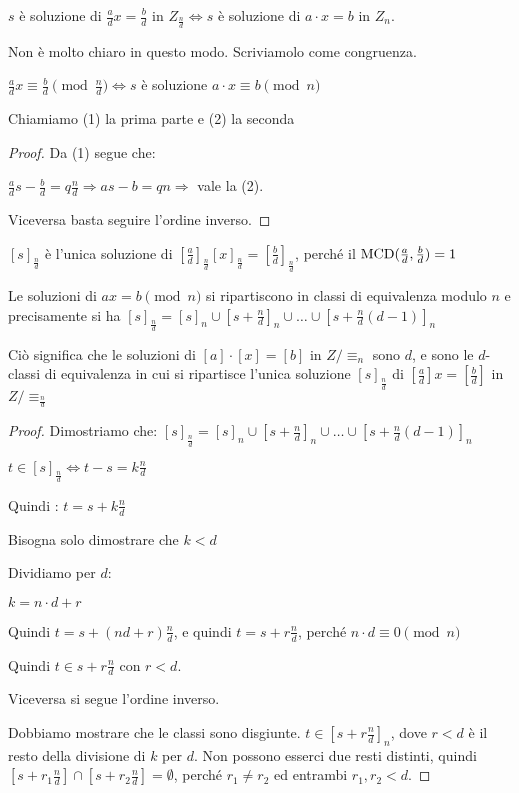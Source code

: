\begin{enumerate}
    $s$ \`e soluzione di $\frac{a}{d} x = \frac{b}{d}$ in $Z_{\frac{n}{d}} \Leftrightarrow s$ \`e soluzione di $a \cdot x = b$ in $Z_n$.

    Non \`e molto chiaro in questo modo. Scriviamolo come congruenza.

    $\frac{a}{d} x \equiv \frac{b}{d} \pmod \frac{n}{d} \Leftrightarrow s$ \`e soluzione $a \cdot x \equiv b \pmod n$

    Chiamiamo (1) la prima parte e (2) la seconda
    \begin{proof}
    Da (1) segue che:

    $\frac{a}{d} s - \frac{b}{d} = q \frac{n}{d} \Rightarrow a s - b = q n \Rightarrow$ vale la (2).

    Viceversa basta seguire l'ordine inverso.
    \end{proof}
    $[s]_{\frac{n}{d}}$ \`e l'unica soluzione di $[\frac{a}{d}]_{\frac{n}{d}} [x]_{\frac{n}{d}} = [\frac{b}{d}]_{\frac{n}{d}}$, perch\'e il $\operatorname{MCD}(\frac{a}{d}, \frac{b}{d}) = 1$

    Le soluzioni di $ax = b \pmod n$ si ripartiscono in classi di equivalenza modulo $n$ e precisamente si ha $[s]_{\frac{n}{d}} = [s]_{n} \cup [s + \frac{n}{d}]_{n} \cup \dots \cup [s + \frac{n}{d}(d-1)]_{n}$

    Ci\`o significa che le soluzioni di $[a] \cdot [x] = [b]$ in $Z / \equiv_n$ sono $d$, e sono le $d$-classi di equivalenza in cui si ripartisce l'unica soluzione $[s]_{\frac{n}{d}}$ di $[\frac{a}{d}] x = [\frac{b}{d}]$ in $Z / \equiv_{\frac{n}{d}}$

    \begin{proof}
    Dimostriamo che: $[s]_{\frac{n}{d}} = [s]_{n} \cup [s + \frac{n}{d}]_{n} \cup \dots \cup [s + \frac{n}{d}(d-1)]_{n}$

    $t \in [s]_{\frac{n}{d}} \Leftrightarrow t - s = k \frac{n}{d}$

    Quindi : $t = s + k \frac{n}{d}$

    Bisogna solo dimostrare che $k < d$

    Dividiamo per $d$:

    $k = n \cdot d + r$

    Quindi $t = s + (n d + r) \frac{n}{d}$, e quindi
    $t = s + r \frac{n}{d}$, perch\'e $n \cdot d \equiv 0 \pmod n$

    Quindi $t \in s + r \frac{n}{d}$ con $r < d$.

    Viceversa si segue l'ordine inverso.

    Dobbiamo mostrare che le classi sono disgiunte. $t \in [s + r \frac{n}{d}]_{n}$, dove $r < d$ \`e il resto della divisione di $k$ per $d$. Non possono esserci due resti distinti, quindi $[s + r_1 \frac{n}{d}] \cap [s + r_2 \frac{n}{d}] = \emptyset$, perch\'e $r_1 \neq r_2$ ed entrambi $r_1, r_2 < d$.
    \end{proof}
\end{enumerate}


